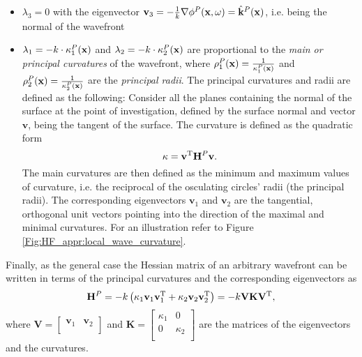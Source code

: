\begin{itemize}
\item $\lambda_3 = 0$ with the eigenvector $\mathbf{v}_3 = - \frac{1}{k} \nabla \phi^P(\mathbf{x},\omega) = \hat{\mathbf{k}}^P(\mathbf{x})$, i.e. being the normal of the wavefront
\item $\lambda_1 = -k \cdot \kappa^P_1(\mathbf{x})$ and $\lambda_2 = -k \cdot	\kappa^P_2(\mathbf{x})$ are proportional to the \emph{main or principal curvatures} of the wavefront, where $\rho^P_1(\mathbf{x}) = \frac{1}{\kappa^P_1(\mathbf{x})}$ and $\rho^P_2(\mathbf{x}) = \frac{1}{\kappa^P_2(\mathbf{x})}$ are the \emph{principal radii}.
The principal curvatures and radii are defined as the following:
Consider all the planes containing the normal of the surface at the point of investigation, defined by the surface normal and vector $\mathbf{v}$, being the tangent of the surface.
The curvature is defined as the quadratic form 
\begin{equation}
\kappa = \mathbf{v}^{\mathrm{T}} \mathbf{H}^P \mathbf{v}.
\label{Eq:App:curvature_def}
\end{equation}
The main curvatures are then defined as the minimum and maximum values of curvature, i.e. the reciprocal of the osculating circles' radii (the principal radii).
The corresponding eigenvectors $\mathbf{v}_1$ and $\mathbf{v}_2$ are the tangential, orthogonal unit vectors pointing into the direction of the maximal and minimal curvatures.
For an illustration refer to Figure \ref{Fig:HF_appr:local_wave_curvature}.
\end{itemize}
Finally, as the general case the Hessian matrix of an arbitrary wavefront can be written in terms of the principal curvatures and the corresponding eigenvectors as
\begin{equation}
\mathbf{H}^P = -k \left( \kappa_1  \mathbf{v}_1 \mathbf{v}_1^\mathrm{T} + \kappa_2 \mathbf{v}_2 \mathbf{v}_2^\mathrm{T} \right) = -k \mathbf{V} \mathbf{K} \mathbf{V}^{\mathrm{T}},
\label{Eq:App:Hessian_w_curvature}
\end{equation}
where $\mathbf{V} = \begin{bmatrix} \mathbf{v}_1 & \mathbf{v}_2 \\\end{bmatrix}$ and $\mathbf{K} = \begin{bmatrix} \kappa_1 & 0 \\[.0em] 0 & \kappa_2 \\[0.0em] \end{bmatrix}$ are the matrices of the eigenvectors and the curvatures.

